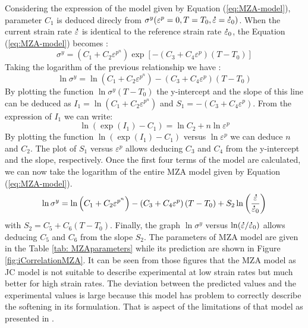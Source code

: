 \documentclass[twoside,english,1p,final,sort&compress]{elsarticle}
\theoremstyle{plain}
\newcommand{\mdot}[1]{\accentset{\mbox{\bfseries .}}{#1}}
\begin{document}
Considering the expression of the model given by Equation (\ref{eq:MZA-model}), parameter $C_1$ is deduced direcly from $\sigma^y(\varepsilon^p=0,T=T_0,\mdot\varepsilon=\mdot{\varepsilon}_0)$. When the current strain rate $\mdot\varepsilon$ is identical to the reference strain rate $\mdot{\varepsilon}_0$, the Equation (\ref{eq:MZA-model}) becomes :
\begin{equation}
\sigma^y = \left(C_{1}+C_{2}\varepsilon^{p^n}\right) \exp\left[-\left(C_{3}+C_{4}\varepsilon^p\right)\left(T-T_0\right)\right]
\end{equation}
Taking the logarithm of the previous relationship we have :
\begin{equation}
\ln\sigma^y = \ln\left(C_{1}+C_{2}\varepsilon^{p^n}\right)-\left(C_{3}+C_{4}\varepsilon^p\right)\left(T-T_0\right)
\end{equation}
By plotting the function $\ln\sigma^y\left(T-T_0\right)$ the y-intercept and the slope of this line can be deduced as $I_1=\ln\left(C_1+C_2\varepsilon^{p^n}\right)$ and $S_1=-\left(C_3+C_4\varepsilon^p\right)$.
From the expression of $I_1$ we can write:
\begin{equation}
\ln\left(\exp(I_1)-C_1\right) = \ln C_2+n\ln\varepsilon^p
\end{equation}
By plotting the function $\ln\left(\exp(I_1)-C_1\right)$ versus $\ln\varepsilon^p$ we can deduce $n$ and $C_2$. The plot of $S_1$ versus $\varepsilon^p$ allows deducing $C_3$ and $C_4$ from the y-intercept and the slope, respectively. Once the first four terms of the model are calculated, we can now take the logarithm of the entire MZA model given by Equation (\ref{eq:MZA-model}).
\begin{equation}
\ln\sigma^y = \ln\left(C_{1}+C_{2}\varepsilon^{p^n}\right) - \left(C_{3}+C_{4}\varepsilon^p\right)\left(T-T_0\right) + S_2\ln\left( \frac{\mdot\varepsilon}{\mdot{\varepsilon}_0}\right)
\end{equation}
with $S_2=C_5+C_6\left(T-T_0\right)$. Finally, the graph $\ln\sigma^y$ versus $ \ln(\mdot\varepsilon/\mdot{\varepsilon}_0)$ allows deducing $C_5$ and $C_6$ from the slope $S_2$. The parameters of MZA model are given in the Table \ref{tab: MZAparameters} while its prediction are shown in Figure \ref{fig:iCorrelationMZA}. It can be seen from those figures that the MZA model as JC model is not suitable to describe experimental at low strain rates but much better for high strain rates. The deviation between the predicted values and the experimental values is large because this model has problem to correctly describe the softening in its formulation. That is aspect of the limitations of that model as presented in \cite{TizeMha-2022}.
\end{document}
